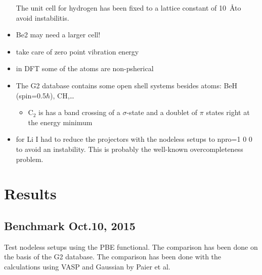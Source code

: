 \documentclass{book}
\begin{document}
\begin{itemize}
The unit cell for hydrogen has been fixed to a lattice constant of
10~\AA to avoid instabilitis.

\item Be2 may need a larger cell!
\item take care of zero point vibration energy
\item in DFT some of the atoms are non-psherical
\item The G2 database contains some open shell systems besides atoms:
BeH (spin=0.5$\hbar$), CH,\ldots
\begin{itemize}
\item C$_2$ is has a band crossing of a $\sigma$-state and a doublet of
$\pi$ states right at the energy minimum
\end{itemize}
\item for Li I had to reduce the projectors with the nodeless
  setups to npro=1 0 0 to avoid an instability. This is probably
  the well-known overcompleteness problem.
\end{itemize}

\newpage
\section*{Results}
\subsection*{Benchmark Oct.10, 2015}
Test nodeless setups using the PBE
functional\cite{perdew96_prl77_3865}. The comparison has been done on
the basis of the G2 database. The comparison has been done with the
calculations using VASP and Gaussian by Paier et
al.\cite{paier05_jcp122_234102}
\end{document}
